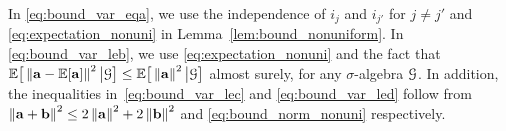 \documentclass[10pt,twocolumn,journal]{IEEEtran}
\begin{document}
In \eqref{eq:bound_var_eqa}, we use the independence of $i_j$ and $i_{j'}$ for $j\ne j'$ and \eqref{eq:expectation_nonuni} in Lemma~\ref{lem:bound_nonuniform}. 
In \eqref{eq:bound_var_leb}, we use \eqref{eq:expectation_nonuni} and the fact that $\mathbb{E}\big[\left\Vert\mathbf{a}-\mathbb{E}[\mathbf{a}]\right\Vert^2\big\vert\mathcal{G}\big]\le \mathbb{E}\big[\left\Vert\mathbf{a}\right\Vert^2\big\vert\mathcal{G}\big]$ almost surely, for any $\sigma$-algebra $\mathcal{G}$. In addition, the inequalities in~\eqref{eq:bound_var_lec} and \eqref{eq:bound_var_led}  follow from $\left\Vert\mathbf{a}+\mathbf{b}\right\Vert^2\le 2\left\Vert\mathbf{a}\right\Vert^2+2\left\Vert\mathbf{b}\right\Vert^2$ 
and \eqref{eq:bound_norm_nonuni} respectively.
 
\end{document}
